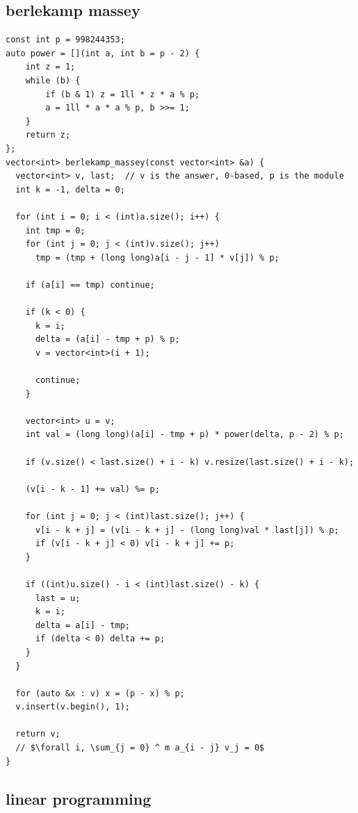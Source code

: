 \documentclass[UTF8, a4paper, titlepage, twoside]{ctexart}
\begin{document}
\subsection{ berlekamp massey }
\begin{lstlisting}[style=cpp]
const int p = 998244353;
auto power = [](int a, int b = p - 2) {
    int z = 1;
    while (b) {
        if (b & 1) z = 1ll * z * a % p;
        a = 1ll * a * a % p, b >>= 1;
    }
    return z;
};
vector<int> berlekamp_massey(const vector<int> &a) {
  vector<int> v, last;  // v is the answer, 0-based, p is the module
  int k = -1, delta = 0;

  for (int i = 0; i < (int)a.size(); i++) {
    int tmp = 0;
    for (int j = 0; j < (int)v.size(); j++)
      tmp = (tmp + (long long)a[i - j - 1] * v[j]) % p;

    if (a[i] == tmp) continue;

    if (k < 0) {
      k = i;
      delta = (a[i] - tmp + p) % p;
      v = vector<int>(i + 1);

      continue;
    }

    vector<int> u = v;
    int val = (long long)(a[i] - tmp + p) * power(delta, p - 2) % p;

    if (v.size() < last.size() + i - k) v.resize(last.size() + i - k);

    (v[i - k - 1] += val) %= p;

    for (int j = 0; j < (int)last.size(); j++) {
      v[i - k + j] = (v[i - k + j] - (long long)val * last[j]) % p;
      if (v[i - k + j] < 0) v[i - k + j] += p;
    }

    if ((int)u.size() - i < (int)last.size() - k) {
      last = u;
      k = i;
      delta = a[i] - tmp;
      if (delta < 0) delta += p;
    }
  }

  for (auto &x : v) x = (p - x) % p;
  v.insert(v.begin(), 1);

  return v;
  // $\forall i, \sum_{j = 0} ^ m a_{i - j} v_j = 0$
}
\end{lstlisting}

\subsection{ linear programming }

\newpage
\end{document}
